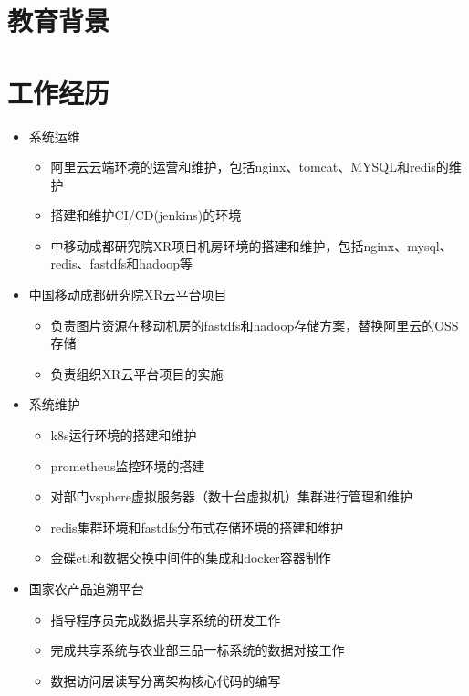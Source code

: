 \documentclass{resume}
\begin{document}
\section{教育背景}

\vspace{4mm}

\section{工作经历}
\begin{itemize}
  \item 系统运维
  \begin{itemize}
    \item 阿里云云端环境的运营和维护，包括nginx、tomcat、MYSQL和redis的维护
    \item 搭建和维护CI/CD(jenkins)的环境
    \item 中移动成都研究院XR项目机房环境的搭建和维护，包括nginx、mysql、redis、fastdfs和hadoop等
  \end{itemize}
  \item 中国移动成都研究院XR云平台项目
  \begin{itemize}
    \item 负责图片资源在移动机房的fastdfs和hadoop存储方案，替换阿里云的OSS存储
    \item 负责组织XR云平台项目的实施
  \end{itemize}
\end{itemize}

\begin{itemize}
  \item 系统维护
  \begin{itemize}
    \item k8s运行环境的搭建和维护
    \item prometheus监控环境的搭建
    \item 对部门vsphere虚拟服务器（数十台虚拟机）集群进行管理和维护
    \item redis集群环境和fastdfs分布式存储环境的搭建和维护
    \item 金碟etl和数据交换中间件的集成和docker容器制作
  \end{itemize}
  \item 国家农产品追溯平台
  \begin{itemize}
    \item 指导程序员完成数据共享系统的研发工作
    \item 完成共享系统与农业部三品一标系统的数据对接工作
    \item 数据访问层读写分离架构核心代码的编写
  \end{itemize}
\end{itemize}
\end{document}
